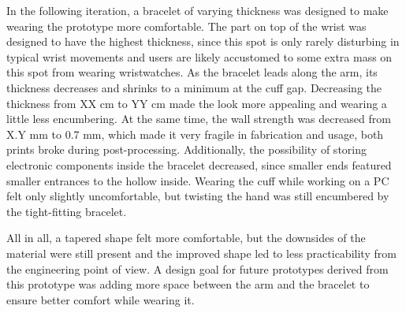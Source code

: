 In the following iteration, a bracelet of varying thickness was designed to make wearing the prototype more comfortable. The part on top of the wrist was designed to have the highest thickness, since this spot is only rarely disturbing in typical wrist movements and users are likely accustomed to some extra mass on this spot from wearing wristwatches. As the bracelet leads along the arm, its thickness decreases and shrinks to a minimum at the cuff gap. Decreasing the thickness from XX cm to YY cm made the look more appealing and wearing a little less encumbering. At the same time, the wall strength was decreased from X.Y mm to 0.7 mm, which made it very fragile in fabrication and usage, both prints broke during post-processing. Additionally, the possibility of storing electronic components inside the bracelet decreased, since smaller ends featured smaller entrances to the hollow inside. Wearing the cuff while working on a PC felt only slightly uncomfortable, but twisting the hand was still encumbered by the tight-fitting bracelet. 

All in all, a tapered shape felt more comfortable, but the downsides of the material were still present and the improved shape led to less practicability from the engineering point of view. A design goal for future prototypes derived from this prototype was adding more space between the arm and the bracelet to ensure better comfort while wearing it.

